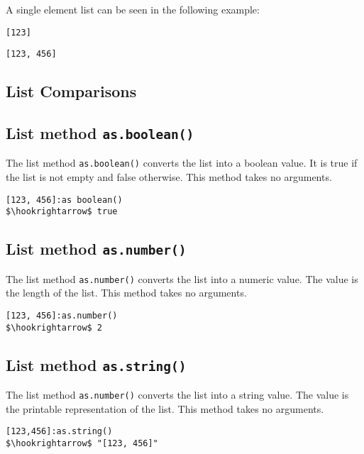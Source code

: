 \documentclass[11pt,a4paper]{scrbook}
\begin{document}
A single element list can be seen in the following example:

\begin{lstlisting}[language=BibTool,mathescape=true]
[123]
\end{lstlisting}

\begin{lstlisting}[language=BibTool,mathescape=true]
[123, 456]
\end{lstlisting}


\subsection{List Comparisons}



\subsection{List method \texttt{as.boolean()}}

The list method \texttt{as.boolean()} converts the list into a boolean value.
It is true if the list is not empty and false otherwise. This method takes no
arguments.

\begin{lstlisting}[language=BibTool,mathescape=true]
[123, 456]:as boolean()
$\hookrightarrow$ true
\end{lstlisting}

\subsection{List method \texttt{as.number()}}

The list method \texttt{as.number()} converts the list into a numeric value.
The value is the length of the list. This method takes no arguments.

\begin{lstlisting}[language=BibTool,mathescape=true]
[123, 456]:as.number()
$\hookrightarrow$ 2
\end{lstlisting}

\subsection{List method \texttt{as.string()}}

The list method \texttt{as.number()} converts the list into a string value.
The value is the printable representation of the list. This method takes no
arguments.

\begin{lstlisting}[language=BibTool,mathescape=true]
[123,456]:as.string()
$\hookrightarrow$ "[123, 456]"
\end{lstlisting}
\end{document}
